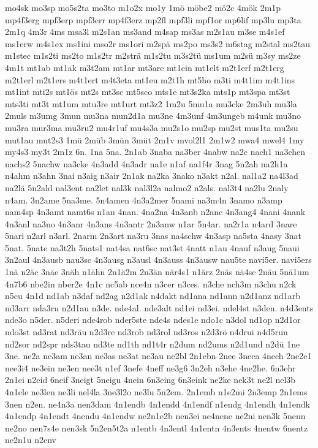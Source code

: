 {mo4sk
mo3sp
mo5s2ta
mo3to
m1o2x
mo1y
1mö
möbe2
mö2c
4mök
2m1p
mp4f3erg
mpf3erp
mpf3err
mp4f3erz
mp2fl
mpf3li
mpf1or
mp6lif
mp3lu
mp3ta
2m1q
4m3r
4ms
msa3l
m2s1an
ms3and
m4sap
ms3as
m2s1au
m3se
m4s1ef
ms1erw
m4s1ex
ms1ini
mso2r
ms1ori
m2spä
ms2po
ms3s2
m6stag
m2stal
ms2tau
m1stec
m1s2ti
ms2to
m1s2tr
m2strä
m1s2tu
m3s2tü
ms1um
m2sü
m3sy
ms2ze
4m1t
mt1ab
mt1ak
m3t2am
mt1ar
mt3are
mt1ein
mt1elt
m2t1erf
m2t1erg
m2t1erl
m2t1ers
m4t1ert
m4t3eta
mt1eu
m2t1h
mt5ho
m3ti
m4t1im
m4t1ins
mt1int
mti2s
mt1ös
mt2s
mt3sc
mt5sco
mts1e
mt3s2ka
mts1p
mt3spa
mt3st
mts3ti
mt3t
mt1um
mtu3re
mt1urt
mt3z2
1m2u
5mu1a
mu3cke
2m3uh
mu3la
2muls
m3umg
3mun
mu3na
mun2d1a
mu3ne
4m3unf
4m3ungeb
m4unk
mu3no
mu3ra
mur3ma
mu3ru2
mu4r1uf
mu4s3a
mu2s1o
mu2sp
mu2st
mus1ta
mu2su
mut1au
mut2s3
1mü
2müb
3mün
3müt
2m1v
mvol2l1
2m1w2
mwa4
mwel4
1my
my4s3
my3t
2m1z
6n.
1na
5na.
2n1ab
3naba
na3ber
4nabw
na2c
nach1
na3chen
nachs2
5nachw
na3cke
4n3add
4n3adr
na1e
n1af
na1f4r
3nag
5n2ah
na2h1a
n4ahm
n3ahn
3nai
n3aig
n3air
2n1ak
na2ka
3nako
n3akt
n2al.
nal1a2
na4l3ad
na2lä
5n2ald
nal3ent
na2let
nal3k
nal3l2a
nalmo2
n2als.
nal3t4
na2lu
2naly
n4am.
3n2ame
5na3me.
5n4amen
4n3a2mer
5nami
na3m4n
3namo
n3amp
nam4sp
4n3amt
namt6s
n1an
4nan.
4na2na
4n3anb
n2anc
4n3ang4
4nani
4nank
4n3anl
na3no
4n3anr
4n3ans
4n3antr
2n3anw
n1ar
5n4ar.
na2r1a
n4ard
3nare
5nari
n2arl
n3arl.
2narm
2n3art
na3ru
3nas
na4schw
4n3asp
na5sta
4nasy
3nat
5nat.
5nate
na3t2h
5nats1
nat4sa
nat6sc
nat3st
4natt
n1au
4nauf
n3aug
5naui
3n2aul
4n3ausb
nau3sc
4n3ausg
n3ausl
4n3auss
4n3ausw
nau5te
navi5er.
navi5ers
1nä
n2äc
3näe
3näh
n1ähn
2n1ä2m
2n3än
när4s1
n1ärz
2näs
nä4sc
2näu
5nä1um
4n7b6
nbe2in
nber2e
4n1c
nc5ab
nce4n
n3cer
n3ces.
n3che
nch3m
n3chu
n2ck
n5cu
4n1d
nd1ab
n3daf
nd2ag
n2d1ak
n4dakt
nd1ana
nd1ann
n2d1anz
nd1arb
nd3arr
nda3ru
n2d1au
n3de.
nde4al.
nde3alt
nd1ei
nd3ei.
ndel4st
n3den.
n4d3ents
nde3o
n5der.
n5deri
nde4rob
nder5ste
nde4s
ndes1e
ndo1c
n3dol
nd1op
n2d1or
ndo3st
nd3rat
nd3räu
n2d3re
nd3rob
nd3rol
nd3ros
n2d3rö
n4drui
n4d5run
nd2sor
nd2spr
nds3tau
nd3te
nd1th
nd1t4r
n2dum
nd2ums
n2d1und
n2dü
1ne
3ne.
ne2a
ne3am
ne3an
ne3as
ne3at
ne3au
ne2bl
2n1ebn
2nec
3neca
4nech
2ne2e1
nee3i4
ne3ein
ne3en
nee3t
n1ef
3nefe
4neff
ne3g6
3n2eh
n3ehe
4ne2he.
6n3ehr
2n1ei
n2eid
6neif
3neigt
5neigu
4nein
6n3eing
6n3eink
ne2ke
nek3t
ne2l
nel3b
4n1ele
ne3len
ne3li
nel4la
3ne3l2o
ne3lu
5n2em.
2n1emb
n1e2mi
2n3emp
2n1ems
3nen
n2en.
ne4n3a
nen3dam
4n1endb
4n1endd
4n1endf
n1endg
4n1endh
4n1endk
4n1endp
4n1endt
4nendu
4n1endw
ne2n1e2b
nen3ei
ne4nene
ne2ni
nen3k
5nenn
ne2no
nen7s4e
nen3sk
5n2en5t2a
n1entb
4n3entl
4n1entn
4n3ents
4nentw
6nentz
ne2n1u
n2env
}
